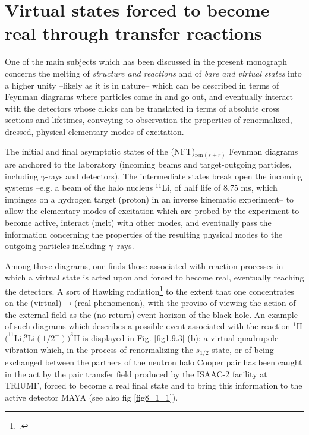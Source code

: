 \section[Virtual states forced to become real]{Virtual states forced to become real through transfer reactions}\label{C6S4}
One of the main subjects which has been discussed in the present monograph concerns the melting of \textit{structure and reactions} and of \textit{bare and virtual states} into a higher unity --likely as it is in nature-- which can be described in terms of Feynman diagrams where particles come in and go out, and eventually interact with the detectors whose clicks can be translated in terms of absolute cross sections and lifetimes, conveying to observation the properties of renormalized, dressed, physical elementary modes of excitation.


The initial and final asymptotic states of the (NFT)$_{\text{ren} (s+r)}$ Feynman diagrams are anchored to the laboratory (incoming beams and target-outgoing particles, including $\gamma$-rays and detectors). The intermediate states break open the incoming systems --e.g. a beam of the halo nucleus $^{11}$Li, of half life of 8.75 ms, which impinges on a hydrogen target (proton) in an inverse kinematic experiment-- to allow the elementary modes of excitation which are probed by the experiment to become active, interact (melt) with other modes, and eventually pass the information concerning the properties of the resulting physical modes to the outgoing particles including $\gamma$--rays.


Among these diagrams, one finds those associated with reaction processes in which a virtual state is acted upon and forced to become real, eventually reaching the detectors. A sort of Hawking radiation\footnote{\cite{Barranco:19b}.} to the extent that one concentrates on the (virtual)$\to$(real phenomenon), with the proviso of viewing the action of the external field as the (no-return) event horizon of the black hole.
An example of such diagrams which describes a possible event associated with the reaction $^1$H$(^{11}$Li,$^9$Li$(1/2^-))^3$H is displayed in Fig. \ref{fig1.9.3} (b): a virtual quadrupole vibration which, in the process of renormalizing the $s_{1/2}$ state, or of being exchanged between the partners of the neutron halo Cooper pair has been caught in the act by the pair transfer field produced by the ISAAC-2 facility at TRIUMF, forced to become a real final state and to bring this information to the active detector MAYA (see also fig \ref{fig8_1_1}).
